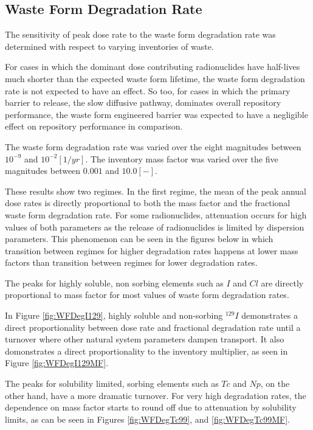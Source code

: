 
\subsection{Waste Form Degradation Rate}

The sensitivity of peak dose rate to the waste form degradation rate was 
determined with respect to varying inventories of waste.

For cases in which the dominant dose contributing 
radionuclides have half-lives much shorter than the expected waste form lifetime, 
the waste form degradation rate is not expected to have an effect. So too, for 
cases in which the primary barrier to release, the slow diffusive pathway, 
dominates overall repository performance, the waste form engineered barrier was
expected to have a negligible effect on repository performance in comparison.

The waste form degradation rate was varied over the eight magnitudes 
between $10^{-9}$ and $10^{-2} [1/yr]$. The inventory mass factor was varied 
over the five magnitudes between $0.001$ and $10.0 [-]$. 

These results show two regimes. In the first regime, the mean of the peak annual 
dose rates is directly proportional to both the mass factor and the fractional 
waste form degradation rate. For some radionuclides, attenuation occurs for high 
values of both parameters as the release of radionuclides is limited by 
dispersion parameters. This phenomenon can be seen in the figures below in which 
transition between regimes for higher degradation rates happens at lower mass 
factors than transition between regimes for lower degradation rates. 

The peaks for highly soluble, non sorbing elements such as $I$ and $Cl$
are directly proportional to mass factor for most 
values of waste form degradation rates. 

In Figure \ref{fig:WFDegI129}, highly soluble and non-sorbing $^{129}I$ 
demonstrates a direct proportionality between dose rate and fractional 
degradation rate until a turnover where other natural system parameters dampen 
transport. It also domonstrates a direct proportionality to the inventory 
multiplier, as seen in Figure \ref{fig:WFDegI129MF}. 

The peaks for solubility limited, sorbing elements such as $Tc$ and $Np$, on the 
other hand, have a more dramatic turnover.  For very high degradation rates, the 
dependence on mass factor starts to round off due to attenuation by solubility 
limits, as can be seen in Figures 
\ref{fig:WFDegTc99}, and \ref{fig:WFDegTc99MF}.

